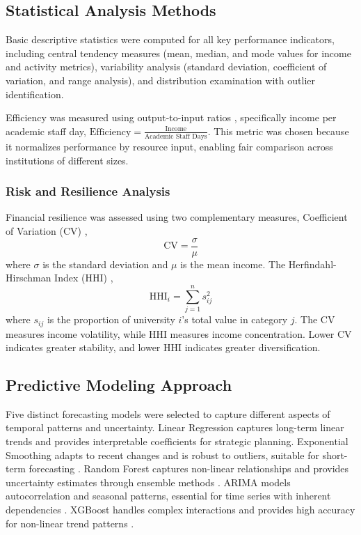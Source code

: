 \documentclass[journal,onecolumn, 10pt,draftclsnofoot]{IEEEtran}
\begin{document}
\subsection{Statistical Analysis Methods}

Basic descriptive statistics were computed for all key performance indicators, including central tendency measures (mean, median, and mode values for income and activity metrics), variability analysis (standard deviation, coefficient of variation, and range analysis), and distribution examination with outlier identification.

Efficiency was measured using output-to-input ratios \cite{charnes1978measuring,banker1984models}, specifically income per academic staff day, $\text{Efficiency} = \frac{\text{Income}}{\text{Academic Staff Days}}$. This metric was chosen because it normalizes performance by resource input, enabling fair comparison across institutions of different sizes.

\subsubsection{Risk and Resilience Analysis}

Financial resilience was assessed using two complementary measures, Coefficient of Variation (CV) \cite{pearson1896contributions,fisher1922mathematical},
\begin{equation}
\mathrm{CV} = \frac{\sigma}{\mu}
\end{equation}
where $\sigma$ is the standard deviation and $\mu$ is the mean income. The Herfindahl-Hirschman Index (HHI) \cite{hirschman1945national,herfindahl1950concentration},
\begin{equation}
\mathrm{HHI}_i = \sum_{j=1}^n s_{ij}^2
\end{equation}
where $s_{ij}$ is the proportion of university $i$'s total value in category $j$. The CV measures income volatility, while HHI measures income concentration. Lower CV indicates greater stability, and lower HHI indicates greater diversification.

\subsection{Predictive Modeling Approach}

Five distinct forecasting models were selected to capture different aspects of temporal patterns and uncertainty. Linear Regression captures long-term linear trends and provides interpretable coefficients for strategic planning. Exponential Smoothing adapts to recent changes and is robust to outliers, suitable for short-term forecasting \cite{hyndman2018forecasting}. Random Forest captures non-linear relationships and provides uncertainty estimates through ensemble methods \cite{breiman2001random}. ARIMA models autocorrelation and seasonal patterns, essential for time series with inherent dependencies \cite{box2015time}. XGBoost handles complex interactions and provides high accuracy for non-linear trend patterns \cite{chen2016xgboost}.
\end{document}
